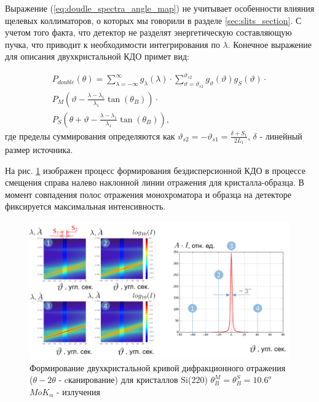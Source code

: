 Выражение (\ref{eq:doudle_spectra_angle_map}) не учитывает особенности влияния
 щелевых коллиматоров, о которых мы говорили в
разделе \ref{sec:slits_section}. С учетом того факта, что детектор не разделят
 энергетическую составляющую пучка, что приводит к необходимости интегрирования по $\lambda$.
Конечное выражение для описания двухкристальной КДО примет вид:

\begin{eqnarray} \label{eq:doudle_spectra_angle_map_on_detector}
  P_{double}(\theta) = \sum_{\lambda = -\infty}^{\infty}g_{\lambda}(\lambda)\cdot
  \sum_{\vartheta = \vartheta_{s1}}^{\vartheta_{s2}} g_{\vartheta}(\vartheta) g_{S}(\vartheta) \cdot \nonumber \\
   P_M \left(\vartheta - \frac{\lambda - \lambda_1}{\lambda_1}\tan(\theta_B) \right) \cdot \nonumber \\
   P_S \left(\theta + \vartheta - \frac{\lambda - \lambda_1}{\lambda_1}\tan(\theta_B)\right),
 \end{eqnarray}
 \noindent
 где пределы суммирования определяются как $\vartheta_{s2} = - \vartheta_{s1} = \frac{\delta+S_1}{2L_1}$,
 $\delta$ - линейный размер источника.

 На рис. \ref{ris:double_crystal_form_kdo} изображен процесс формирования
 бездисперсионной КДО в процессе смещения справа налево наклонной линии отражения
 для кристалла-образца. В момент совпадения полос отражения монохроматора и образца
 на детекторе фиксируется максимальная интенсивность.

 \begin{figure}[H]
   \centering
   \includegraphics[width=1\textwidth]{images/double_crystal_form_kdo.png}
   \caption{Формирование двухкристальной кривой дифракционного отражения
    ($\theta - 2\theta$ - cканирование) для кристаллов Si(220)
   $\theta_B^M = \theta_B^S = 10.6^o$  $MoK_{\alpha}$ - излучения}
   \label{ris:double_crystal_form_kdo}
 \end{figure}


